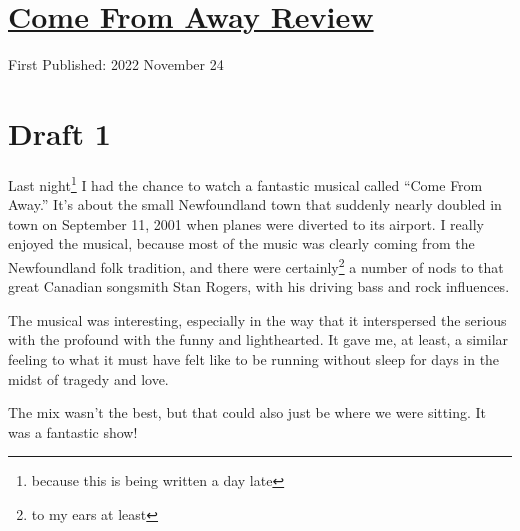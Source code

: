 \documentclass[12pt]{article}[titlepage]
\newcommand{\say}[1]{``#1''}
\newcommand{\1}{\={a}}
\newcommand{\2}{\={e}}
\newcommand{\3}{\={\i}}
\newcommand{\4}{\=o}
\newcommand{\5}{\=u}
\newcommand{\6}{\={A}}
\renewcommand{\,}{\textsuperscript{,}}
\begin{document}
\doublespacing
\section{\href{come-from-away.html}{Come From Away Review}}
First Published: 2022 November 24

\section{Draft 1}
Last night\footnote{because this is being written a day late} I had the chance to watch a fantastic musical called \say{Come From Away.}
It's about the small Newfoundland town that suddenly nearly doubled in town on September 11, 2001 when planes were diverted to its airport.
I really enjoyed the musical, because most of the music was clearly coming from the Newfoundland folk tradition, and there were certainly\footnote{to my ears at least} a number of nods to that great Canadian songsmith Stan Rogers, with his driving bass and rock influences.

The musical was interesting, especially in the way that it interspersed the serious with the profound with the funny and lighthearted.
It gave me, at least, a similar feeling to what it must have felt like to be running without sleep for days in the midst of tragedy and love.

The mix wasn't the best, but that could also just be where we were sitting.
It was a fantastic show!
\end{document}
